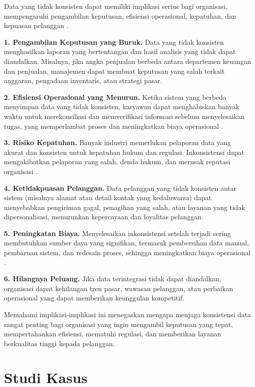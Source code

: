 Data yang tidak konsisten dapat memiliki implikasi serius bagi organisasi, mempengaruhi pengambilan keputusan, efisiensi operasional, kepatuhan, dan kepuasan pelanggan \cite{redman1996impact}.

\textbf{1. Pengambilan Keputusan yang Buruk.}  
Data yang tidak konsisten menghasilkan laporan yang bertentangan dan hasil analisis yang tidak dapat diandalkan. Misalnya, jika angka penjualan berbeda antara departemen keuangan dan penjualan, manajemen dapat membuat keputusan yang salah terkait anggaran, pengadaan inventaris, atau strategi pasar.

\textbf{2. Efisiensi Operasional yang Menurun.}  
Ketika sistem yang berbeda menyimpan data yang tidak konsisten, karyawan dapat menghabiskan banyak waktu untuk merekonsiliasi dan memverifikasi informasi sebelum menyelesaikan tugas, yang memperlambat proses dan meningkatkan biaya operasional \cite{madnick2009overview}.

\textbf{3. Risiko Kepatuhan.}  
Banyak industri memerlukan pelaporan data yang akurat dan konsisten untuk kepatuhan hukum dan regulasi. Inkonsistensi dapat mengakibatkan pelaporan yang salah, denda hukum, dan merusak reputasi organisasi \cite{wang2006data}.

\textbf{4. Ketidakpuasan Pelanggan.}  
Data pelanggan yang tidak konsisten antar sistem (misalnya alamat atau detail kontak yang kedaluwarsa) dapat menyebabkan pengiriman gagal, penagihan yang salah, atau layanan yang tidak dipersonalisasi, menurunkan kepercayaan dan loyalitas pelanggan.

\textbf{5. Peningkatan Biaya.}  
Menyelesaikan inkonsistensi setelah terjadi sering membutuhkan sumber daya yang signifikan, termasuk pembersihan data manual, pembaruan sistem, dan redesain proses, sehingga meningkatkan biaya operasional \cite{pipino2002dataquality}.

\textbf{6. Hilangnya Peluang.}  
Jika data terintegrasi tidak dapat diandalkan, organisasi dapat kehilangan tren pasar, wawasan pelanggan, atau perbaikan operasional yang dapat memberikan keunggulan kompetitif.

Memahami implikasi-implikasi ini menegaskan mengapa menjaga konsistensi data sangat penting bagi organisasi yang ingin mengambil keputusan yang tepat, mempertahankan efisiensi, mematuhi regulasi, dan memberikan layanan berkualitas tinggi kepada pelanggan.


\section{Studi Kasus}

